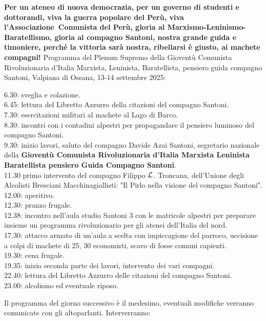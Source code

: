 \documentclass{article}
\begin{document}
\center 
{\huge\bf Per un ateneo di nuova democrazia, per un governo di studenti e dottorandi, viva la guerra popolare del Perù, viva l'Associazione\texttrademark\ Comunista del Perù, gloria al Marxismo-Leninismo-Baratellismo, gloria al compagno Santoni, nostra grande guida e timoniere, perché la vittoria sarà nostra, ribellarsi è giusto, ai machete compagni!}
\pagebreak
\center
Programma del Plenum Supremo della Gioventù Comunista Rivoluzionaria d'Italia Marxista, Leninista, Baratellista, pensiero guida compagno Santoni, Valpiana di Ossana, 13-14 settembre 2025:
\flushleft
\begin{multicols}{2}
    6.30: sveglia e colazione.\\
    6.45: lettura del Libretto Azzurro della citazioni del compagno Santoni.\\
    7.30: esercitazioni militari al machete al Lago di Barco.\\
    8.30: incontri con i contadini alpestri per propagandare il pensiero luminoso del compagno Santoni.\\
    9.30: inizio lavori, saluto del compagno Davide Azai Santoni, segretario nazionale della {\bf Gioventù Comunista Rivoluzionaria d'Italia Marxista Leninista Baratellista pensiero Guida Compagno Santoni}.\\
    11.30 primo intervento del compagno Filippo $\mathcal{L}$. Troncana, dell'Unione degli Alcolisti Bresciani Macchinagiallisti: "Il Pirlo nella visione del compagno Santoni".\\
    12.00: aperitivo.\\
    12.30: pranzo frugale.\\
    12.38: incontro nell'aula studio Santoni 3 con le matricole alpestri per preparare insieme un programma rivoluzionario per gli atenei dell'Italia del nord.\\
    17.30: attacco armato di un'aula a scelta con impiccagione del parroco, uccisione a colpi di machete di 25, 30 economisti, scavo di fosse comuni capienti.\\
    19.30: cena frugale.\\
    19.35: inizio seconda parte dei lavori, intervento dei vari compagni.\\
    22.40: lettura del Libretto Azzurro delle citazioni del compagno Santoni.\\
    23.00: alcolismo ed eventuale riposo.\\
\end{multicols}
\center
Il programma del giorno successivo è il medesimo, eventuali modifiche verranno comunicate con gli altoparlanti. Interverranno:
\end{document}
